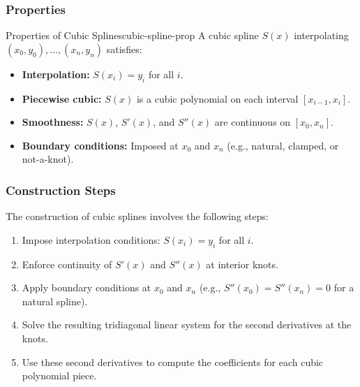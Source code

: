 \subsubsection{Properties}
\begin{property}{Properties of Cubic Splines}{cubic-spline-prop}
    A cubic spline \(S(x)\) interpolating \((x_0, y_0), \ldots, (x_n, y_n)\) satisfies:
    \begin{itemize}[nosep]
        \item \textbf{Interpolation:} \(S(x_i) = y_i\) for all \(i\).
        \item \textbf{Piecewise cubic:} \(S(x)\) is a cubic polynomial on each interval \([x_{i-1}, x_i]\).
        \item \textbf{Smoothness:} \(S(x)\), \(S'(x)\), and \(S''(x)\) are continuous on \([x_0, x_n]\).
        \item \textbf{Boundary conditions:} Imposed at \(x_0\) and \(x_n\) (e.g., natural, clamped, or not-a-knot).
    \end{itemize}
\end{property}

\subsubsection{Construction Steps}
The construction of cubic splines involves the following steps:
\begin{enumerate}[nosep]
    \item Impose interpolation conditions: \(S(x_i) = y_i\) for all \(i\).
    \item Enforce continuity of \(S'(x)\) and \(S''(x)\) at interior knots.
    \item Apply boundary conditions at \(x_0\) and \(x_n\) (e.g., \(S''(x_0) = S''(x_n) = 0\) for a natural spline).
    \item Solve the resulting tridiagonal linear system for the second derivatives at the knots.
    \item Use these second derivatives to compute the coefficients for each cubic polynomial piece.
\end{enumerate}

